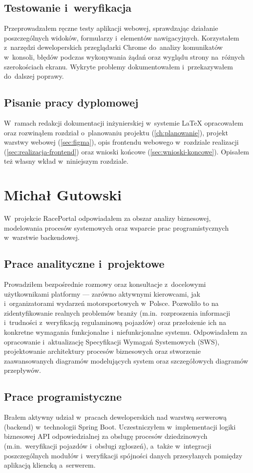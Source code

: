 \documentclass{sprz}
\begin{document}
\subsection{Testowanie i~weryfikacja}
Przeprowadzałem ręczne testy aplikacji webowej, sprawdzając działanie poszczególnych widoków, formularzy i~elementów nawigacyjnych. Korzystałem z~narzędzi deweloperskich przeglądarki Chrome do~analizy komunikatów w~konsoli, błędów podczas wykonywania żądań oraz wyglądu strony na~różnych szerokościach ekranu. Wykryte problemy dokumentowałem i~przekazywałem do~dalszej poprawy.

\subsection{Pisanie pracy dyplomowej}
W~ramach redakcji dokumentacji inżynierskiej w~systemie \LaTeX{} opracowałem oraz rozwinąłem rozdział o~planowaniu projektu (\ref{ch:planowanie}), projekt warstwy webowej (\ref{sec:figma}), opis frontendu webowego w~rozdziale realizacji (\ref{sec:realizacja-frontend}) oraz wnioski końcowe (\ref{sec:wnioski-koncowe}). Opisałem też własny wkład w~niniejszym rozdziale.

\section{Michał Gutowski}
W~projekcie RacePortal odpowiadałem za obszar analizy biznesowej, modelowania procesów systemowych oraz wsparcie prac programistycznych w~warstwie backendowej.

\subsection{Prace analityczne i~projektowe}
Prowadziłem bezpośrednie rozmowy oraz konsultacje z~docelowymi użytkownikami platformy --- zarówno aktywnymi kierowcami, jak i~organizatorami wydarzeń motorsportowych w~Polsce. Pozwoliło to na zidentyfikowanie realnych problemów branży (m.in.\ rozproszenia informacji i~trudności z~weryfikacją regulaminową pojazdów) oraz przełożenie ich na konkretne wymagania funkcjonalne i~niefunkcjonalne systemu. Odpowiadałem za opracowanie i~aktualizację Specyfikacji Wymagań Systemowych (SWS), projektowanie architektury procesów biznesowych oraz stworzenie zaawansowanych diagramów modelujących system oraz szczegółowych diagramów przepływów.

\subsection{Prace programistyczne}
Brałem aktywny udział w~pracach deweloperskich nad warstwą serwerową (backend) w~technologii Spring Boot. Uczestniczyłem w~implementacji logiki biznesowej API odpowiedzialnej za obsługę procesów dziedzinowych (m.in.\ weryfikacji pojazdów i~obsługi zgłoszeń), a~także w~integracji poszczególnych modułów i~weryfikacji spójności danych przesyłanych pomiędzy aplikacją kliencką a~serwerem.
\end{document}
